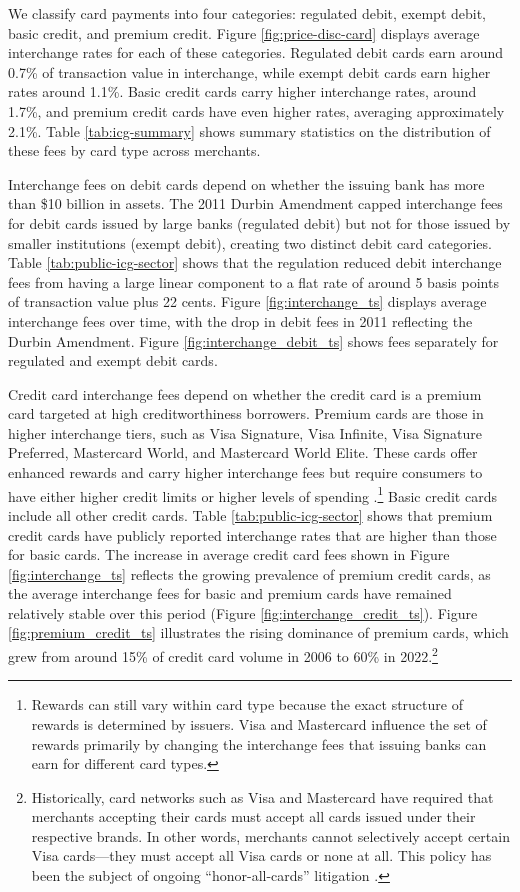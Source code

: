 \documentclass[11pt,english]{article}
\theoremstyle{remark}
\begin{document}
We classify card payments into four categories: regulated debit, exempt debit, basic credit, and premium credit.
Figure \ref{fig:price-disc-card} displays average interchange rates for each of these categories.
Regulated debit cards earn around 0.7\% of transaction value in interchange, while exempt debit cards earn higher rates around 1.1\%.
Basic credit cards carry higher interchange rates, around 1.7\%, and premium credit cards have even higher rates, averaging approximately 2.1\%.
Table \ref{tab:icg-summary} shows summary statistics on the distribution of these fees by card type across merchants.

Interchange fees on debit cards depend on whether the issuing bank has more than \$10 billion in assets.
The 2011 Durbin Amendment capped interchange fees for debit cards issued by large banks (regulated debit) but not for those issued by smaller institutions (exempt debit), creating two distinct debit card categories.
Table \ref{tab:public-icg-sector} shows that the regulation reduced debit interchange fees from having a large linear component to a flat rate of around 5 basis points of transaction value plus 22 cents.
Figure \ref{fig:interchange_ts} displays average interchange fees over time, with the drop in debit fees in 2011 reflecting the Durbin Amendment.
Figure \ref{fig:interchange_debit_ts} shows fees separately for regulated and exempt debit cards.

Credit card interchange fees depend on whether the credit card is a premium card targeted at high creditworthiness borrowers.
Premium cards are those in higher interchange tiers, such as Visa Signature, Visa Infinite, Visa Signature Preferred, Mastercard World, and Mastercard World Elite.
These cards offer enhanced rewards and carry higher interchange fees but require consumers to have either higher credit limits or higher levels of spending \citep{Visa2022}.\footnote{Rewards can still vary within card type because the exact structure of rewards is determined by issuers. Visa and Mastercard influence the set of rewards primarily by changing the interchange fees that issuing banks can earn for different card types.}
Basic credit cards include all other credit cards.
Table \ref{tab:public-icg-sector} shows that premium credit cards have publicly reported interchange rates that are higher than those for basic cards.
The increase in average credit card fees shown in Figure \ref{fig:interchange_ts} reflects the growing prevalence of premium credit cards, as the average interchange fees for basic and premium cards have remained relatively stable over this period (Figure \ref{fig:interchange_credit_ts}).
Figure \ref{fig:premium_credit_ts} illustrates the rising dominance of premium cards, which grew from around 15\% of credit card volume in 2006 to 60\% in 2022.\footnote{Historically, card networks such as Visa and Mastercard have required that merchants accepting their cards must accept all cards issued under their respective brands.
In other words, merchants cannot selectively accept certain Visa cards---they must accept all Visa cards or none at all.
This policy has been the subject of ongoing ``honor-all-cards'' litigation \citep{Andriotis2025}.
}
\end{document}
